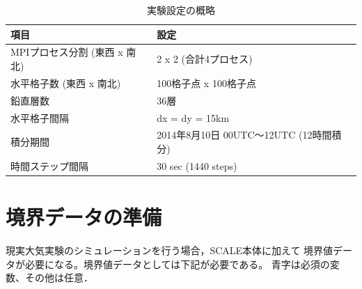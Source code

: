 \begin{table}[h]
\begin{center}
  \caption{実験設定の概略}
  \label{tab:grids}
  \begin{tabularx}{150mm}{|l|X|} \hline
    \rowcolor[gray]{0.9} 項目 & 設定 \\ \hline
    MPIプロセス分割 (東西 x 南北) & 2 x 2 (合計4プロセス) \\ \hline
    水平格子数 (東西 x 南北) & 100格子点 x 100格子点 \\ \hline
    鉛直層数                 & 36層                  \\ \hline
    水平格子間隔             & dx = dy = 15km       \\ \hline
    積分期間 & 2014年8月10日 00UTC～12UTC (12時間積分) \\ \hline
    時間ステップ間隔 & 30 sec (1440 steps) \\ \hline
  \end{tabularx}
\end{center}
\end{table}


\section{境界データの準備}

現実大気実験のシミュレーションを行う場合，SCALE本体に加えて
境界値データが必要になる。境界値データとしては下記が必要である。
{\color{blue}青字}は必須の変数、その他は任意．

